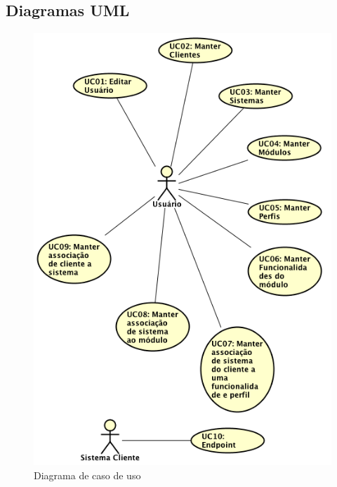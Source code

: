 \subsection{Diagramas UML}

\begin{figure}
	\label{fig:Diagrama de caso de uso}
	\includegraphics[width=1\textwidth]{img/Diagrama_de_caso_de_uso}
	\caption{Diagrama de caso de uso}
\end{figure}


